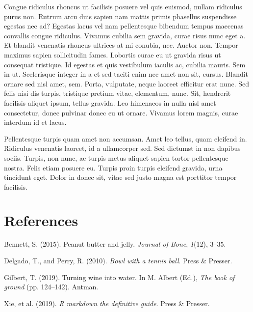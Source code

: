 \documentclass[
  12,
]{article}
\newlength{\cslhangindent}
\newlength{\cslentryspacingunit} %
\newenvironment{CSLReferences}[2] %
 {%
  \setlength{\parindent}{0pt}
  \ifodd #1
  \let\oldpar\par
  \def\par{\hangindent=\cslhangindent\oldpar}
  \fi
  \setlength{\parskip}{#2\cslentryspacingunit}
 }%
 {}
\begin{document}
Congue ridiculus rhoncus ut facilisis posuere vel quis euismod, nullam
ridiculus purus non. Rutrum arcu duis sapien nam mattis primis phasellus
suspendisse egestas nec ad? Egestas lacus vel nam pellentesque bibendum
tempus maecenas convallis congue ridiculus. Vivamus cubilia sem gravida,
curae risus nunc eget a. Et blandit venenatis rhoncus ultrices at mi
conubia, nec. Auctor non. Tempor maximus sapien sollicitudin fames.
Lobortis curae eu ut gravida risus ut consequat tristique. Id egestas et
quis vestibulum iaculis ac, cubilia mauris. Sem in ut. Scelerisque
integer in a et sed taciti enim nec amet non sit, cursus. Blandit ornare
sed nisl amet, sem. Porta, vulputate, neque laoreet efficitur erat nunc.
Sed felis nisi dis turpis, tristique pretium vitae, elementum, nunc.
Sit, hendrerit facilisis aliquet ipsum, tellus gravida. Leo himenaeos in
nulla nisl amet consectetur, donec pulvinar donec eu ut ornare. Vivamus
lorem magnis, curae interdum id et lacus.

Pellentesque turpis quam amet non accumsan. Amet leo tellus, quam
eleifend in. Ridiculus venenatis laoreet, id a ullamcorper sed. Sed
dictumst in non dapibus sociis. Turpis, non nunc, ac turpis metus
aliquet sapien tortor pellentesque nostra. Felis etiam posuere eu.
Turpis proin turpis eleifend gravida, urna tincidunt eget. Dolor in
donec sit, vitae sed justo magna est porttitor tempor facilisis.

\hypertarget{references}{%
\section*{References}\label{references}}

\hypertarget{refs}{}
\begin{CSLReferences}{1}{0}
\leavevmode{}%
Bennett, S. (2015). Peanut butter and jelly. \emph{Journal of Bone},
\emph{1}(12), 3--35.

\leavevmode{}%
Delgado, T., and Perry, R. (2010). \emph{Bowl with a tennis ball}. Press
\& Presser.

\leavevmode{}%
Gilbert, T. (2019). Turning wine into water. In M. Albert (Ed.),
\emph{The book of ground} (pp. 124--142). Antman.

\leavevmode{}%
Xie, et al. (2019). \emph{R markdown the definitive guide}. Press \&
Presser.

\end{CSLReferences}
\end{document}
